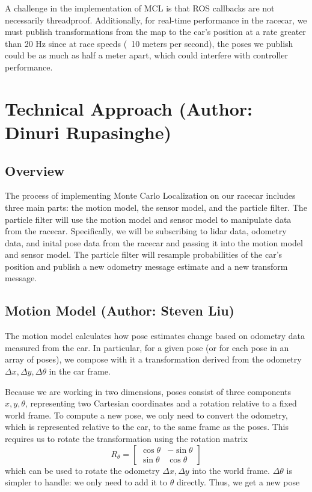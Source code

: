 \documentclass{article}
\begin{document}
A challenge in the implementation of MCL is that ROS callbacks are not necessarily threadproof. Additionally, for real-time performance in the racecar, we must publish transformations from the map to the car's position at a rate greater than 20 Hz since at race speeds (~10 meters per second), the poses we publish could be as much as half a meter apart, which could interfere with controller performance. \\

\section{Technical Approach (Author: Dinuri Rupasinghe)}

\subsection{Overview}
The process of implementing Monte Carlo Localization on our racecar includes three main parts: the motion model, the sensor model, and the particle filter. The particle filter will  use the motion model and sensor model to manipulate data from the racecar. Specifically, we will be subscribing to lidar data, odometry data, and inital pose data from the racecar and passing it into the motion model and sensor model. The particle filter will resample probabilities of the car's position and publish a new odometry message estimate and a new transform message.

\subsection{Motion Model (Author: Steven Liu)}

The motion model calculates how pose estimates change based on odometry data measured from the car. In particular, for a given pose (or for each pose in an array of poses), we compose with it a transformation derived from the odometry $\Delta x,\Delta y,\Delta \theta$ in the car frame.

Because we are working in two dimensions, poses consist of three components $x,y,\theta$, representing two Cartesian coordinates and a rotation relative to a fixed world frame. To compute a new pose, we only need to convert the odometry, which is represented relative to the car, to the same frame as the poses. This requires us to rotate the transformation using the rotation matrix \[R_\theta = \left[\begin{matrix}\cos\theta & -\sin\theta \\ \sin\theta & \cos\theta \end{matrix}\right]\] which can be used to rotate the odometry $\Delta x,\Delta y$ into the world frame. $\Delta\theta$ is simpler to handle: we only need to add it to $\theta$ directly. Thus, we get a new pose
\end{document}
